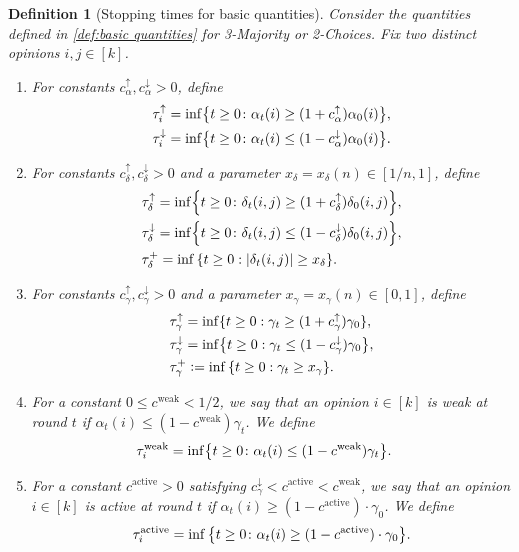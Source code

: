 \documentclass[letterpaper,11pt]{article}
\newtheorem{definition}[theorem]{Definition}
\def\defeq{\mathrel{\mathop:}=}
\DeclarePairedDelimiter{\cbra}{\lbrace}{\rbrace} %
\newcommand{\alphanorm}{\gamma}
\newcommand{\taudeltaplus}{\tau^{+}_\delta}
\newcommand{\cweak}{c^{\mathrm{weak}}}
\newcommand{\taunormup}{\tau^{\uparrow}_\alphanorm}
\newcommand{\taunormdown}{\tau^{\downarrow}_\alphanorm}
\newcommand{\taunormplus}{\tau^{+}_{\alphanorm}}
\newcommand{\cnormup}{c^{\uparrow}_\alphanorm}
\newcommand{\cnormdown}{c^{\downarrow}_\alphanorm}
\newcommand{\taudeltaup}{\tau^{\uparrow}_\delta}
\newcommand{\cdeltaup}{c^{\uparrow}_\delta}
\newcommand{\taudeltadown}{\tau^{\downarrow}_\delta}
\newcommand{\cdeltadown}{c^{\downarrow}_\delta}
\newcommand{\tauiup}{\tau^{\uparrow}_i}
\newcommand{\ciup}{c_\alpha^{\uparrow}}
\newcommand{\tauidown}{\tau^{\downarrow}_i}
\newcommand{\cidown}{c_\alpha^{\downarrow}}
\newcommand{\tauiweak}{\tau^{\mathrm{weak}}_i}
\newcommand{\cactive}{c^{\mathrm{active}}}
\newcommand{\xdelta}{x_{\delta}}
\newcommand{\tauiactive}{\tau^{\mathrm{active}}_i}
\newcommand{\xnorm}{x_{\alphanorm}}
\begin{document}
\begin{definition}[Stopping times for basic quantities] \label{def:stopping times}
  Consider the quantities defined in \cref{def:basic quantities} for 3-Majority or 2-Choices.
  Fix two distinct opinions $i,j\in [k]$.
\begin{enumerate}
  \renewcommand{\labelenumi}{(\roman{enumi})}
  \item  For constants $\ciup,\cidown>0$, define
    \begin{align*}
        &\tauiup = \inf\cbra*{ t \ge 0 \colon \alpha_t(i) \ge (1+\ciup)\alpha_0(i)},\\
        &\tauidown = \inf\cbra*{ t \ge 0 \colon \alpha_t(i) \le (1-\cidown)\alpha_0(i)}.
    \end{align*}

  \item For constants $ \cdeltaup,\cdeltadown >0$ and a parameter $ \xdelta = \xdelta(n) \in [1/n, 1]$, define
    \begin{align*}
        &\taudeltaup = \inf\cbra*{ t \ge 0 \colon \delta_t(i,j) \ge (1+\cdeltaup) \delta_0(i,j) },\\
        &\taudeltadown = \inf\cbra*{ t \ge 0 \colon \delta_t(i,j) \le (1-\cdeltadown) \delta_0(i,j) }, \\
        &\taudeltaplus= \inf\qty{t\geq 0: \abs{\delta_t(i,j)}\geq \xdelta}.
    \end{align*}

  \item For constants $\cnormup,\cnormdown>0$ and a parameter $\xnorm = \xnorm(n)\in[0,1]$, define
    \begin{align*}
        &\taunormup = \inf\{t\geq 0: \alphanorm_t\geq (1+\cnormup)\alphanorm_0\}, \\
        &\taunormdown = \inf\cbra*{t\geq 0: \alphanorm_t\leq (1-\cnormdown)\alphanorm_0}, \\
        &\taunormplus \defeq \inf\qty{t\geq 0: \alphanorm_t\geq \xnorm}. 
    \end{align*}

  \item For a constant $0\le \cweak<1/2$, we say that an opinion $i\in[k]$ is \emph{weak at round $t$} if $\alpha_t(i) \le (1-\cweak) \alphanorm_t$.
    We define
    \begin{align*} 
        &\tauiweak = \inf\cbra*{ t \ge 0 \colon \alpha_t(i) \le (1-\cweak) \alphanorm_t }.
    \end{align*}
  \item  For a constant $\cactive>0$ satisfying $\cnormdown<\cactive<\cweak$, we say that an opinion $ i \in [k]$ is \emph{active at round $ t $} if $ \alpha_t(i) \ge (1-\cactive)\cdot \alphanorm_0$.
  We define
  \begin{align*} 
    \tauiactive = \inf\qty{ t \ge 0 \colon \alpha_t(i) \ge (1-\cactive)\cdot \alphanorm_0 } .
  \end{align*}
\end{enumerate}


\end{definition}
\end{document}
